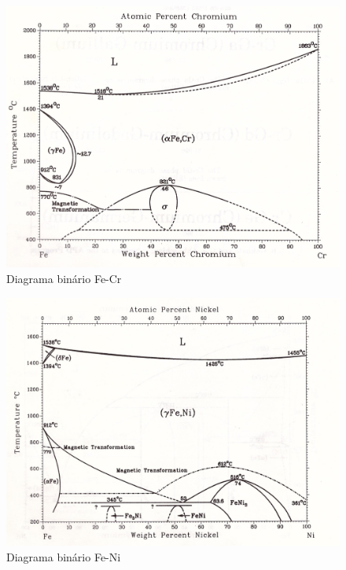 \documentclass[brazil,tf,epusp]{usp}  %
\begin{document}
\begin{figure}
  \includegraphics[width=1.1\textwidth]{img/Fe-Cr.jpg}
  \caption{Diagrama binário Fe-Cr}
  \label{fig:bin_fe-cr}
\end{figure}

\begin{figure}
  \includegraphics[width=1.1\textwidth]{img/Fe-Ni.jpg}
  \caption{Diagrama binário Fe-Ni}
  \label{fig:bin_fe-ni}
\end{figure}
\end{document}
